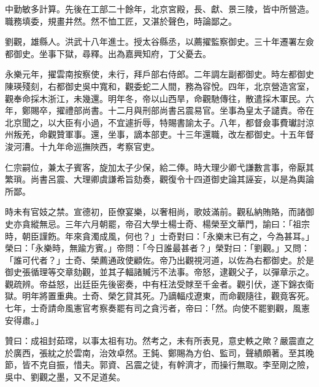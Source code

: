 \begin{pinyinscope}
中勤敏多計算。先後在工部二十餘年，北京宮殿，長、獻、景三陵，皆中所營造。職務填委，規畫井然。然不恤工匠，又湛於聲色，時論鄙之。

劉觀，雄縣人。洪武十八年進士。授太谷縣丞，以薦擢監察御史。三十年遷署左僉都御史。坐事下獄，尋釋。出為嘉興知府，丁父憂去。

永樂元年，擢雲南按察使，未行，拜戶部右侍郎。二年調左副都御史。時左都御史陳瑛殘刻，右都御史吳中寬和，觀委蛇二人間，務為容悅。四年，北京營造宮室，觀奉命採木浙江，未幾還。明年冬，帝以山西旱，命觀馳傳往，散遣採木軍民。六年，鄭賜卒，擢禮部尚書。十二月與刑部尚書呂震易官。坐事為皇太子譴責。帝在北京聞之，以大臣有小過，不宜遽折辱，特賜書諭太子。八年，都督僉事費瓛討涼州叛羌，命觀贊軍事。還，坐事，謫本部吏。十三年還職，改左都御史。十五年督浚河漕。十九年命巡撫陜西，考察官吏。

仁宗嗣位，兼太子賓客，旋加太子少保，給二俸。時大理少卿弋謙數言事，帝厭其繁瑣。尚書呂震、大理卿虞謙希旨劾奏，觀復令十四道御史論其誣妄，以是為輿論所鄙。

時未有官妓之禁。宣德初，臣僚宴樂，以奢相尚，歌妓滿前。觀私納賄賂，而諸御史亦貪縱無忌。三年六月朝罷，帝召大學士楊士奇、楊榮至文華門，諭曰：「祖宗時，朝臣謹飭。年來貪濁成風，何也？」士奇對曰：「永樂末已有之，今為甚耳。」榮曰：「永樂時，無踰方賓。」帝問：「今日誰最甚者？」榮對曰：「劉觀。」又問：「誰可代者？」士奇、榮薦通政使顧佐。帝乃出觀視河道，以佐為右都御史。於是御史張循理等交章劾觀，並其子輻諸贓污不法事。帝怒，逮觀父子，以彈章示之。觀疏辨。帝益怒，出廷臣先後密奏，中有枉法受賕至千金者。觀引伏，遂下錦衣衛獄。明年將置重典。士奇、榮乞貸其死。乃謫輻戍遼東，而命觀隨往，觀竟客死。七年，士奇請命風憲官考察奏罷有司之貪污者，帝曰：「然。向使不罷劉觀，風憲安得肅。」

贊曰：成祖封茹瑺，以事太祖有功。然考之，未有所表見，意史軼之歟？嚴震直之於廣西，張紞之於雲南，治效卓然。王鈍、鄭賜為方伯、監司，聲績頗著。至其晚節，皆不克自振，惜夫。郭資、呂震之徒，有幹濟才，而操行無取。李至剛之險，吳中、劉觀之墨，又不足道矣。


\end{pinyinscope}